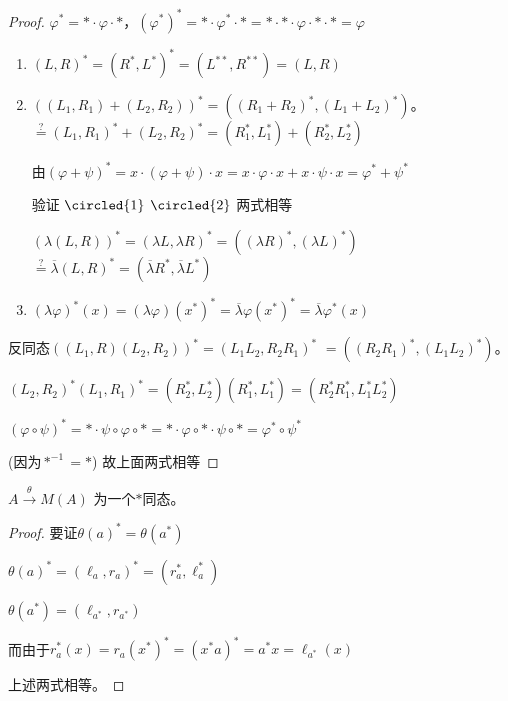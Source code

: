 \documentclass[lang=cn,a4paper,newtx,section]{elegantbook}
\begin{document}
\begin{proof}
  $\varphi^* = * \cdot \varphi \cdot *$，$(\varphi^*)^* = * \cdot \varphi^* \cdot * = * \cdot * \cdot \varphi \cdot * \cdot * = \varphi$
 
  
  \begin{enumerate}
    \item $(L, R)^* = (R^*, L^*)^* = (L^{**}, R^{**}) = (L, R)$
    
    \item $((L_1, R_1) + (L_2, R_2))^* = ((R_1 + R_2)^*, (L_1 + L_2)^*)$。
    $\stackrel{?}{=} (L_1, R_1)^* + (L_2, R_2)^* = (R_1^*, L_1^*) + (R_2^*, L_2^*)$
    
    由$(\varphi + \psi)^* = x \cdot (\varphi + \psi) \cdot x = x \cdot \varphi \cdot x + x \cdot \psi \cdot x = \varphi^* + \psi^*$
    
    验证 $\circled{1}$  $\circled{2}$ 两式相等
    
    $(\lambda(L, R))^* = (\lambda L, \lambda R)^* = ((\lambda R)^*, (\lambda L)^*)$
     $\stackrel{?}{=} \overline{\lambda}(L, R)^* = (\overline{\lambda}R^*, \overline{\lambda}L^*)$
    
    \item $(\lambda\varphi)^*(x) = (\lambda\varphi)(x^*)^* = \overline{\lambda}\varphi(x^*)^* = \overline{\lambda}\varphi^*(x)$
    

  \end{enumerate}
  
  反同态$((L_1, R)(L_2, R_2))^* = (L_1L_2, R_2R_1)^*$
  $= ((R_2R_1)^*, (L_1L_2)^*)$。
  
  $(L_2, R_2)^*(L_1, R_1)^* = (R_2^*, L_2^*)(R_1^*, L_1^*) = (R_2^*R_1^*, L_1^*L_2^*)$
  
  $(\varphi \circ \psi)^* = * \cdot \psi \circ \varphi \circ * = * \cdot \varphi \circ * \cdot \psi \circ * = \varphi^* \circ \psi^*$
  
  (因为$*^{-1} = *$) 故上面两式相等
\end{proof}

\begin{proposition}
  $A \xrightarrow{\theta} M(A)$ 为一个$*$同态。
\end{proposition}

\begin{proof}
  要证$\theta(a)^* = \theta(a^*)$
  
  $\theta(a)^* = (\ell_a, r_a)^* = (r_a^*, \ell_a^*)$
  
  $\theta(a^*) = (\ell_{a^*}, r_{a^*})$
  
  而由于$r_a^*(x) = r_a(x^*)^* = (x^*a)^* = a^*x = \ell_{a^*}(x)$
  
  上述两式相等。
\end{proof}
\end{document}
